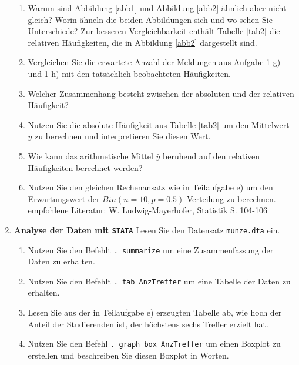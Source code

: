 \documentclass[11pt]{article}
\newcommand{\aufgabe}[1]{\item{\bf #1}}
\begin{document}
\begin{enumerate}
\begin{enumerate}
\item{Warum sind Abbildung \ref{abb1} und Abbildung \ref{abb2} ähnlich aber nicht gleich? Worin ähneln die beiden Abbildungen sich
und wo sehen Sie Unterschiede? Zur besseren Vergleichbarkeit enthält Tabelle \ref{tab2} die relativen Häufigkeiten, die in Abbildung
\ref{abb2} dargestellt sind.}
\item{Vergleichen Sie die erwartete Anzahl der Meldungen aus  Aufgabe 1 g) und 1 h) mit den tatsächlich beobachteten Häufigkeiten.}
\item{Welcher Zusammenhang besteht zwischen der absoluten und der relativen Häufigkeit?}
\item{Nutzen Sie die absolute Häufigkeit aus Tabelle \ref{tab2} um den Mittelwert $\bar{y}$ zu berechnen und interpretieren Sie diesen Wert.}
\item{Wie kann das arithmetische Mittel $\bar{y}$ beruhend auf den relativen Häufigkeiten berechnet werden?}
\item{Nutzen Sie den gleichen Rechenansatz wie in Teilaufgabe e) um den Erwartungswert der $Bin(n=10,p=0.5)$-Verteilung zu berechnen.
empfohlene Literatur: W. Ludwig-Mayerhofer, Statistik S. 104-106}
\end{enumerate}
\newpage
\aufgabe{Analyse der Daten mit \texttt{STATA}} %
Lesen Sie den Datensatz \texttt{munze.dta} ein.
\begin{enumerate}
\item{Nutzen Sie den Befehlt \texttt{. summarize} um eine Zusammenfassung der Daten zu erhalten.}
\item{Nutzen Sie den Befehlt \texttt{. tab AnzTreffer} um eine Tabelle der Daten zu erhalten.}
\item{Lesen Sie aus der in Teilaufgabe e) erzeugten Tabelle ab, wie hoch der Anteil der Studierenden ist,
der höchstens sechs Treffer erzielt hat.}
\item{Nutzen Sie den Befehl  \texttt{. graph box AnzTreffer} um einen Boxplot zu erstellen und beschreiben Sie diesen Boxplot in Worten.}
\end{enumerate}

\end{enumerate}
\end{document}
